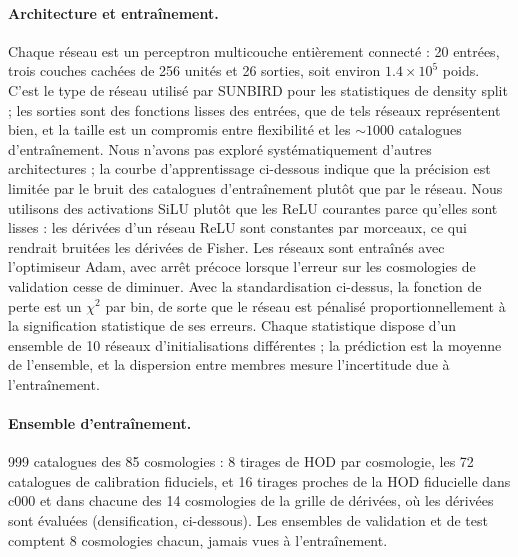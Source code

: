 \paragraph{Architecture et entraînement.} Chaque réseau est un perceptron multicouche entièrement connecté : 20 entrées, trois couches cachées de 256 unités et 26 sorties, soit environ $1.4\times10^5$ poids. C'est le type de réseau utilisé par SUNBIRD \cite{CuestaLazaro2024} pour les statistiques de density split ; les sorties sont des fonctions lisses des entrées, que de tels réseaux représentent bien, et la taille est un compromis entre flexibilité et les $\sim1000$ catalogues d'entraînement. Nous n'avons pas exploré systématiquement d'autres architectures ; la courbe d'apprentissage ci-dessous indique que la précision est limitée par le bruit des catalogues d'entraînement plutôt que par le réseau. Nous utilisons des activations SiLU plutôt que les ReLU courantes parce qu'elles sont lisses : les dérivées d'un réseau ReLU sont constantes par morceaux, ce qui rendrait bruitées les dérivées de Fisher. Les réseaux sont entraînés avec l'optimiseur Adam, avec arrêt précoce lorsque l'erreur sur les cosmologies de validation cesse de diminuer. Avec la standardisation ci-dessus, la fonction de perte est un $\chi^2$ par bin, de sorte que le réseau est pénalisé proportionnellement à la signification statistique de ses erreurs. Chaque statistique dispose d'un ensemble de 10 réseaux d'initialisations différentes ; la prédiction est la moyenne de l'ensemble, et la dispersion entre membres mesure l'incertitude due à l'entraînement.

\paragraph{Ensemble d'entraînement.} 999 catalogues des 85 cosmologies : 8 tirages de HOD par cosmologie, les 72 catalogues de calibration fiduciels, et 16 tirages proches de la HOD fiducielle dans c000 et dans chacune des 14 cosmologies de la grille de dérivées, où les dérivées sont évaluées (densification, ci-dessous). Les ensembles de validation et de test comptent 8 cosmologies chacun, jamais vues à l'entraînement.

